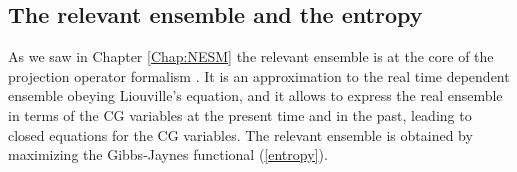 \documentclass[b5paper,openright,11pt]{book}
\begin{document}
\begin{appendices}
\section{The relevant ensemble and the entropy}
As we saw in Chapter \ref{Chap:NESM}
the  relevant ensemble  is  at  the core  of  the projection  operator
formalism \cite{Grabert1982}. It is an  approximation to the real time
dependent  ensemble obeying  Liouville's  equation, and  it allows  to
express the real ensemble in terms  of the CG variables at the present
time and in the past, leading to closed equations for the CG variables.
The  relevant  ensemble is  obtained  by  maximizing the  Gibbs-Jaynes
functional (\ref{entropy}).


\end{appendices}
\end{document}
